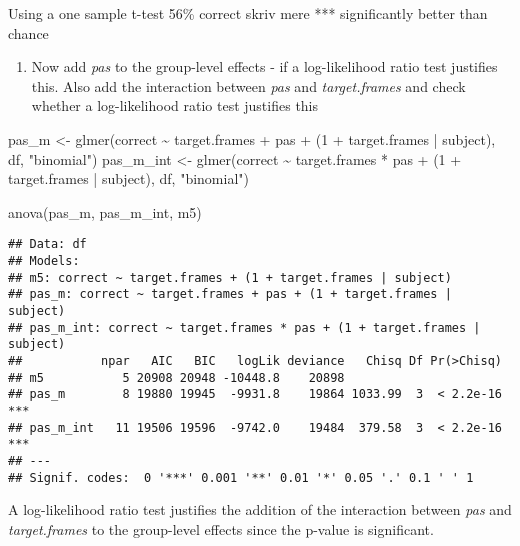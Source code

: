 \documentclass[
]{article}
\newenvironment{Shaded}{\begin{snugshade}}{\end{snugshade}}
\newcommand{\DecValTok}[1]{\textcolor[rgb]{0.00,0.00,0.81}{#1}}
\newcommand{\FunctionTok}[1]{\textcolor[rgb]{0.00,0.00,0.00}{#1}}
\newcommand{\NormalTok}[1]{#1}
\newcommand{\OtherTok}[1]{\textcolor[rgb]{0.56,0.35,0.01}{#1}}
\newcommand{\SpecialCharTok}[1]{\textcolor[rgb]{0.00,0.00,0.00}{#1}}
\newcommand{\StringTok}[1]{\textcolor[rgb]{0.31,0.60,0.02}{#1}}
\providecommand{\tightlist}{%
  \setlength{\itemsep}{0pt}\setlength{\parskip}{0pt}}
\begin{document}
Using a one sample t-test 56\% correct skriv mere *** significantly
better than chance

\begin{enumerate}
\def\labelenumi{\arabic{enumi})}
\setcounter{enumi}{2}
\tightlist
\item
  Now add \emph{pas} to the group-level effects - if a log-likelihood
  ratio test justifies this. Also add the interaction between \emph{pas}
  and \emph{target.frames} and check whether a log-likelihood ratio test
  justifies this
\end{enumerate}

\begin{Shaded}
\begin{Highlighting}[]
\NormalTok{pas\_m }\OtherTok{\textless{}{-}} \FunctionTok{glmer}\NormalTok{(correct }\SpecialCharTok{\textasciitilde{}}\NormalTok{ target.frames }\SpecialCharTok{+}\NormalTok{ pas }\SpecialCharTok{+}\NormalTok{ (}\DecValTok{1} \SpecialCharTok{+}\NormalTok{ target.frames }\SpecialCharTok{|}\NormalTok{ subject), df, }\StringTok{"binomial"}\NormalTok{)}
\NormalTok{pas\_m\_int }\OtherTok{\textless{}{-}} \FunctionTok{glmer}\NormalTok{(correct }\SpecialCharTok{\textasciitilde{}}\NormalTok{ target.frames }\SpecialCharTok{*}\NormalTok{ pas }\SpecialCharTok{+}\NormalTok{ (}\DecValTok{1} \SpecialCharTok{+}\NormalTok{ target.frames }\SpecialCharTok{|}\NormalTok{ subject), df, }\StringTok{"binomial"}\NormalTok{)}

\FunctionTok{anova}\NormalTok{(pas\_m, pas\_m\_int, m5)}
\end{Highlighting}
\end{Shaded}

\begin{verbatim}
## Data: df
## Models:
## m5: correct ~ target.frames + (1 + target.frames | subject)
## pas_m: correct ~ target.frames + pas + (1 + target.frames | subject)
## pas_m_int: correct ~ target.frames * pas + (1 + target.frames | subject)
##           npar   AIC   BIC   logLik deviance   Chisq Df Pr(>Chisq)    
## m5           5 20908 20948 -10448.8    20898                          
## pas_m        8 19880 19945  -9931.8    19864 1033.99  3  < 2.2e-16 ***
## pas_m_int   11 19506 19596  -9742.0    19484  379.58  3  < 2.2e-16 ***
## ---
## Signif. codes:  0 '***' 0.001 '**' 0.01 '*' 0.05 '.' 0.1 ' ' 1
\end{verbatim}

A log-likelihood ratio test justifies the addition of the interaction
between \emph{pas} and \emph{target.frames} to the group-level effects
since the p-value is significant.
\end{document}
